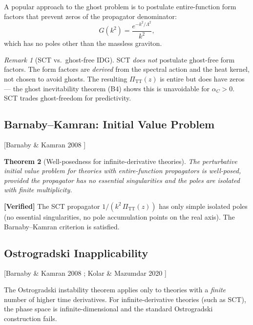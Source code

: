 \documentclass[11pt,a4paper]{article}
\theoremstyle{plain}
\newtheorem{theorem}{Theorem}[section]
\theoremstyle{definition}
\theoremstyle{remark}
\newtheorem{remark}[theorem]{Remark}
\newcommand{\PiTT}{\Pi_{\mathrm{TT}}}
\newcommand{\fromlit}[1]{\textcolor{blue!70!black}{\textsf{[#1]}}}
\newcommand{\verified}[1]{%
  \par\smallskip\noindent
  \colorbox{green!10}{\parbox{\dimexpr\linewidth-2\fboxsep}{%
    \textcolor{green!50!black}{\textbf{[Verified]}} #1}}%
  \par\smallskip}
\begin{document}
A popular approach to the ghost problem is to postulate entire-function
form factors that prevent zeros of the propagator denominator:
\begin{equation}\label{eq:ghost-free}
  G(k^2) = \frac{e^{-k^2/\Lambda^2}}{k^2},
\end{equation}
which has no poles other than the massless graviton.

\begin{remark}[SCT vs.\ ghost-free IDG]
SCT \emph{does not} postulate ghost-free form factors.  The form factors
are \emph{derived} from the spectral action and the heat kernel, not
chosen to avoid ghosts.  The resulting $\PiTT(z)$ is entire but does
have zeros --- the ghost inevitability theorem (B4) shows this is
unavoidable for $\alpha_C > 0$.  SCT trades ghost-freedom for
predictivity.
\end{remark}

\subsection{Barnaby--Kamran: Initial Value Problem}

\fromlit{Barnaby \& Kamran 2008 \cite{BarnabyKamran2007}}

\begin{theorem}[Well-posedness for infinite-derivative theories]
\label{thm:BK}
The perturbative initial value problem for theories with entire-function
propagators is well-posed, provided the propagator has no essential
singularities and the poles are isolated with finite multiplicity.
\end{theorem}

\verified{The SCT propagator $1/(k^2\,\PiTT(z))$ has only simple
isolated poles (no essential singularities, no pole accumulation points
on the real axis).  The Barnaby--Kamran criterion is satisfied.}

\subsection{Ostrogradski Inapplicability}

\fromlit{Barnaby \& Kamran 2008 \cite{BarnabyKamran2007};
Kolar \& Mazumdar 2020 \cite{KolarMazumdar2020}}

The Ostrogradski instability theorem applies only to theories with a
\emph{finite} number of higher time derivatives.  For infinite-derivative
theories (such as SCT), the phase space is infinite-dimensional and the
standard Ostrogradski construction fails.
\end{document}
